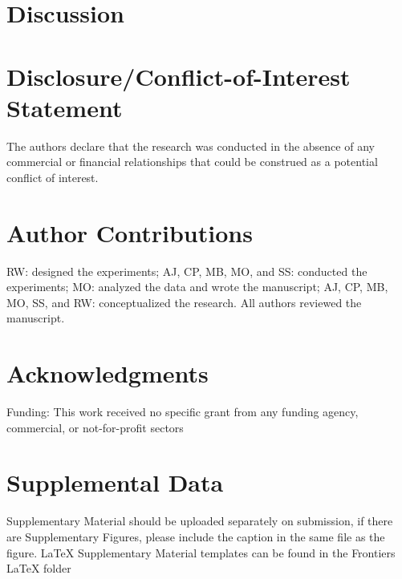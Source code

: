 \documentclass[utf8]{frontiersSCNS}
\begin{document}
\hypertarget{discussion}{%
\section*{Discussion}\label{discussion}}

\hypertarget{disclosureconflict-of-interest-statement}{%
\section*{Disclosure/Conflict-of-Interest
Statement}\label{disclosureconflict-of-interest-statement}}

The authors declare that the research was conducted in the absence of
any commercial or financial relationships that could be construed as a
potential conflict of interest.

\hypertarget{author-contributions}{%
\section*{Author Contributions}\label{author-contributions}}

RW: designed the experiments; AJ, CP, MB, MO, and SS: conducted the
experiments; MO: analyzed the data and wrote the manuscript; AJ, CP, MB,
MO, SS, and RW: conceptualized the research. All authors reviewed the
manuscript.

\hypertarget{acknowledgments}{%
\section*{Acknowledgments}\label{acknowledgments}}

Funding: This work received no specific grant from any funding agency,
commercial, or not-for-profit sectors

\hypertarget{supplemental-data}{%
\section{Supplemental Data}\label{supplemental-data}}

Supplementary Material should be uploaded separately on submission, if
there are Supplementary Figures, please include the caption in the same
file as the figure. LaTeX Supplementary Material templates can be found
in the Frontiers LaTeX folder
\end{document}
